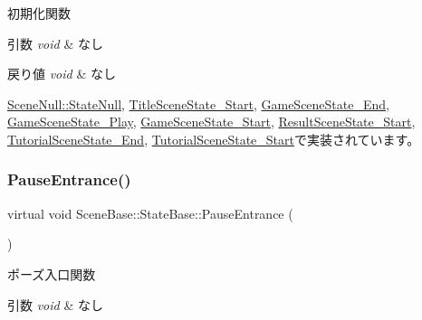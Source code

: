 初期化関数 


\begin{DoxyParams}{引数}
{\em void} & なし \\
\hline
\end{DoxyParams}

\begin{DoxyRetVals}{戻り値}
{\em void} & なし \\
\hline
\end{DoxyRetVals}


\mbox{\hyperlink{class_scene_null_1_1_state_null_ac0b3f1adf01b580144337e37a847131f}{Scene\+Null\+::\+State\+Null}}, \mbox{\hyperlink{class_title_scene_state___start_a3e785ba088ac3fd0989fd657e5d0cd34}{Title\+Scene\+State\+\_\+\+Start}}, \mbox{\hyperlink{class_game_scene_state___end_a3b5c24eb6949215da331a20bdfbc55ae}{Game\+Scene\+State\+\_\+\+End}}, \mbox{\hyperlink{class_game_scene_state___play_a2637c407c8bbe0ef76b472c5b63e8057}{Game\+Scene\+State\+\_\+\+Play}}, \mbox{\hyperlink{class_game_scene_state___start_ae921c57f349fbb2f00a197d40a3404b7}{Game\+Scene\+State\+\_\+\+Start}}, \mbox{\hyperlink{class_result_scene_state___start_a615c7e05efd2320b8956c5fd94398f55}{Result\+Scene\+State\+\_\+\+Start}}, \mbox{\hyperlink{class_tutorial_scene_state___end_a572e5687140ff5ac43789f90462c05a5}{Tutorial\+Scene\+State\+\_\+\+End}}, \mbox{\hyperlink{class_tutorial_scene_state___start_acd4cd7e4efeebffa9616d7ca31c7b1c0}{Tutorial\+Scene\+State\+\_\+\+Start}}で実装されています。

\mbox{\label{class_scene_base_1_1_state_base_aaf225859597bf99de1062bc55f98530d}} 
\subsubsection{\texorpdfstring{Pause\+Entrance()}{PauseEntrance()}}
{\footnotesize\ttfamily virtual void Scene\+Base\+::\+State\+Base\+::\+Pause\+Entrance (\begin{DoxyParamCaption}{ }\end{DoxyParamCaption})\hspace{0.3cm}{\ttfamily [pure virtual]}}



ポーズ入口関数 


\begin{DoxyParams}{引数}
{\em void} & なし \\
\hline
\end{DoxyParams}

